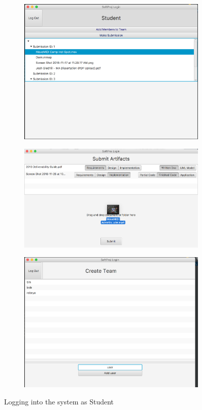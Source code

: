 \begin{figure}[h]
\centering
\begin{subfigure}{.5\textwidth}
  \centering
  \includegraphics[width=.8\linewidth]{content/5.png}
  \caption{}
  \label{fig:sub1}
\end{subfigure}%
\begin{subfigure}{.5\textwidth}
  \centering
  \includegraphics[width=1\linewidth]{content/10.jpg}
  \caption{}
  \label{fig:sub2}
\end{subfigure}

\begin{subfigure}{.5\textwidth}
  \centering
  \includegraphics[width=1\linewidth]{content/6.png}
  \caption{}
  \label{fig:sub2}
\end{subfigure}
\caption{Logging into the system as Student}
\label{fig:test}
\end{figure}

